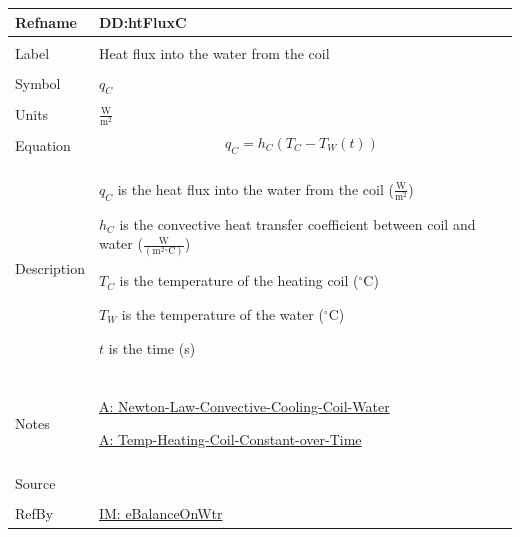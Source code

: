 \documentclass[12pt]{article}
\begin{document}
\vspace{\baselineskip}
\noindent
\begin{minipage}{\textwidth}
\begin{tabular}{>{\raggedright}p{}>{\raggedright\arraybackslash}p{}}
\toprule \textbf{Refname} & \textbf{DD:htFluxC}
\label{DD:htFluxC}
\\ \midrule \\
Label & Heat flux into the water from the coil
        
\\ \midrule \\
Symbol & ${q_{C}}$
         
\\ \midrule \\
Units & $\frac{\text{W}}{\text{m}^{2}}$
        
\\ \midrule \\
Equation & \begin{displaymath}
           {q_{C}}={h_{C}} \left({T_{C}}-{T_{W}}\left(t\right)\right)
           \end{displaymath}
\\ \midrule \\
Description & \begin{symbDescription}
              \item{${q_{C}}$ is the heat flux into the water from the coil ($\frac{\text{W}}{\text{m}^{2}}$)}
              \item{${h_{C}}$ is the convective heat transfer coefficient between coil and water ($\frac{\text{W}}{(\text{m}^{2}{}^{\circ}\text{C})}$)}
              \item{${T_{C}}$ is the temperature of the heating coil (${}^{\circ}$C)}
              \item{${T_{W}}$ is the temperature of the water (${}^{\circ}$C)}
              \item{$t$ is the time (s)}
              \end{symbDescription}
\\ \midrule \\
Notes & \hyperref[assumpLCCCW]{A: Newton-Law-Convective-Cooling-Coil-Water}
        
        \hyperref[assumpTHCCoT]{A: Temp-Heating-Coil-Constant-over-Time}
        
\\ \midrule \\
Source & \cite{koothoor2013}
         
\\ \midrule \\
RefBy & \hyperref[IM:eBalanceOnWtr]{IM: eBalanceOnWtr}
        
\\ \bottomrule
\end{tabular}
\end{minipage}
\end{document}
